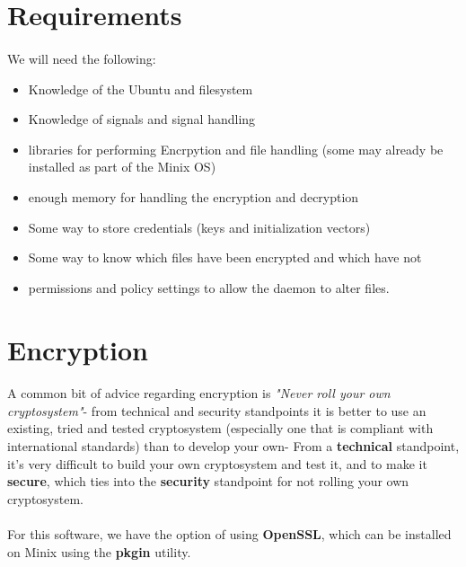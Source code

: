 \documentclass{article}
\begin{document}
\section{Requirements}
    \paragraph{}We will need the following:
    \begin{itemize}
        \item Knowledge of the Ubuntu and filesystem
        \item Knowledge of signals and signal handling
        \item libraries for performing Encrpytion and file handling (some may already be installed as part of the Minix OS)
        \item enough memory for handling the encryption and decryption
        \item Some way to store credentials (keys and initialization vectors)
        \item Some way to know which files have been encrypted and which have not
        \item permissions and policy settings to allow the daemon to alter files.
    \end{itemize}

\section{Encryption}
    \paragraph{}A common bit of advice regarding encryption is \textit{"Never roll your own cryptosystem"}- from technical and security standpoints it is better to use an existing, tried and tested cryptosystem (especially one that is compliant with international standards) than to develop your own- From a \textbf{technical} standpoint, it's very difficult to build your own cryptosystem and test it, and to make it \textbf{secure}, which ties into the \textbf{security} standpoint for not rolling your own cryptosystem.
    
    \paragraph{}For this software, we have the option of using \textbf{OpenSSL}, which can be installed on Minix using the \textbf{pkgin} utility.
    
\end{document}
